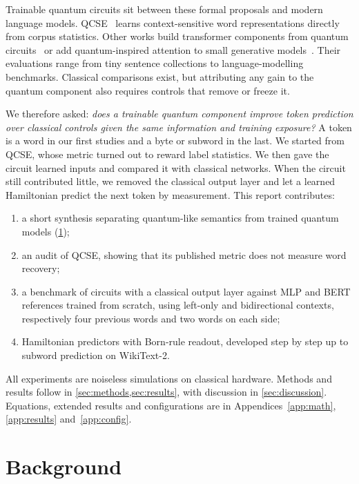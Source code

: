 \documentclass[11pt,a4paper]{article}
\begin{document}
Trainable quantum circuits sit between these formal proposals and modern language models. QCSE~\cite{varmantchaonala2026} learns context-sensitive word representations directly from corpus statistics. Other works build transformer components from quantum circuits~\cite{liao2024,kong2025,khatri2024} or add quantum-inspired attention to small generative models~\cite{kuznetsov2026}. Their evaluations range from tiny sentence collections to language-modelling benchmarks. Classical comparisons exist, but attributing any gain to the quantum component also requires controls that remove or freeze it.

We therefore asked: \emph{does a trainable quantum component improve token prediction over classical controls given the same information and training exposure?} A token is a word in our first studies and a byte or subword in the last. We started from QCSE, whose metric turned out to reward label statistics. We then gave the circuit learned inputs and compared it with classical networks. When the circuit still contributed little, we removed the classical output layer and let a learned Hamiltonian predict the next token by measurement. This report contributes:
\begin{enumerate}[label=(\roman*)]
  \item a short synthesis separating quantum-like semantics from trained quantum models (\cref{sec:background});
  \item an audit of QCSE, showing that its published metric does not measure word recovery;
  \item a benchmark of circuits with a classical output layer against MLP and BERT references trained from scratch, using left-only and bidirectional contexts, respectively four previous words and two words on each side;
  \item Hamiltonian predictors with Born-rule readout, developed step by step up to subword prediction on WikiText-2.
\end{enumerate}
All experiments are noiseless simulations on classical hardware. Methods and results follow in \cref{sec:methods,sec:results}, with discussion in \cref{sec:discussion}. Equations, extended results and configurations are in Appendices~\ref{app:math}, \ref{app:results} and~\ref{app:config}.

\section{Background}
\label{sec:background}
\end{document}
